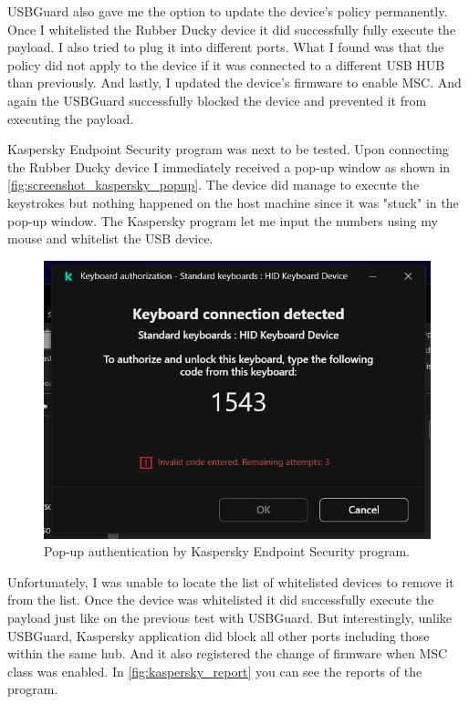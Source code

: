 USBGuard also gave me the option to update the device's policy permanently. Once I whitelisted the Rubber Ducky device it did successfully fully execute the payload. I also tried to plug it into different ports. What I found was that the policy did not apply to the device if it was connected to a different USB HUB than previously. And lastly, I updated the device's firmware to enable MSC. And again the USBGuard successfully blocked the device and prevented it from executing the payload.

Kaspersky Endpoint Security program was next to be tested. Upon connecting the Rubber Ducky device I immediately received a pop-up window as shown in \autoref{fig:screenshot_kaspersky_popup}. The device did manage to execute the keystrokes but nothing happened on the host machine since it was "stuck" in the pop-up window. The Kaspersky program let me input the numbers using my mouse and whitelist the USB device.
\begin{figure}[ht]
    \centering
    \includegraphics[width=\linewidth]{./obrazky-figures/kaspersky_keyboard_test.png}
    \caption{Pop-up authentication by Kaspersky Endpoint Security program.}
    \label{fig:screenshot_kaspersky_popup}
\end{figure}
Unfortunately, I was unable to locate the list of whitelisted devices to remove it from the list. Once the device was whitelisted it did successfully execute the payload just like on the previous test with USBGuard. But interestingly, unlike USBGuard, Kaspersky application did block all other ports including those within the same hub. And it also registered the change of firmware when MSC class was enabled. In \autoref{fig:kaspersky_report} you can see the reports of the program.
